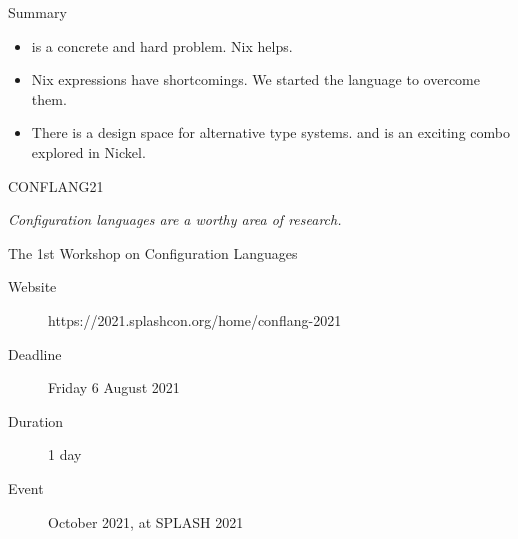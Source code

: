 \documentclass[aspectratio=169]{beamer}
\newcommand{\couleur}[2]{{\color{#1}{#2}}}
\begin{document}
\begin{frame}{Summary}
    \begin{itemize}
        \item \couleur{orange-vivid-tangerine}{Reproducibility} is a concrete
            and hard problem. Nix helps.
        \item Nix expressions have shortcomings. We started the
            \couleur{blue-portage}{Nickel} language to overcome them.
        \item There is a design space for alternative type systems.
            \couleur{pink-froly}{Gradual typing} and
            \couleur{pink-froly}{first-class contracts} is an
            exciting combo explored in Nickel.
    \end{itemize}
\end{frame}

\begin{frame}{CONFLANG21}

    \begin{center}
        \textit{Configuration languages are a worthy area of research.}
    \end{center}

    The 1st Workshop on Configuration Languages

    \begin{description}
        \item[Website] https://2021.splashcon.org/home/conflang-2021
        \item[Deadline] Friday 6 August 2021
        \item[Duration] 1 day
        \item[Event] October 2021, at SPLASH 2021
    \end{description}
\end{frame}
\end{document}
